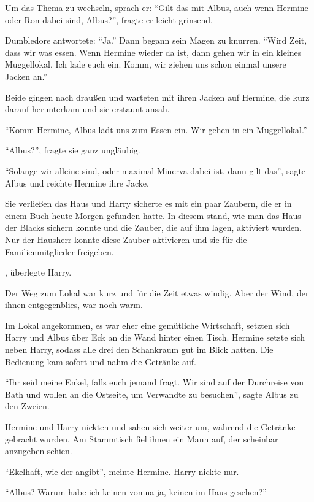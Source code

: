 Um das Thema zu wechseln, sprach er: \enquote{Gilt das mit Albus, auch wenn Hermine oder Ron dabei sind, Albus?}, fragte er leicht grinsend.

Dumbledore antwortete: \enquote{Ja.} Dann begann sein Magen zu knurren. \enquote{Wird Zeit, dass wir was essen. Wenn Hermine wieder da ist, dann gehen wir in ein kleines Muggellokal. Ich lade euch ein. Komm, wir ziehen uns schon einmal unsere Jacken an.}

Beide gingen nach draußen und warteten mit ihren Jacken auf Hermine, die kurz darauf herunterkam und sie erstaunt ansah.

\enquote{Komm Hermine, Albus lädt uns zum Essen ein. Wir gehen in ein Muggellokal.}

\enquote{Albus?}, fragte sie ganz ungläubig.

\enquote{Solange wir alleine sind, oder maximal Minerva dabei ist, dann gilt das}, sagte Albus und reichte Hermine ihre Jacke.

Sie verließen das Haus und Harry sicherte es mit ein paar Zaubern, die er in einem Buch heute Morgen gefunden hatte. In diesem stand, wie man das Haus der Blacks sichern konnte und die Zauber, die auf ihm lagen, aktiviert wurden. Nur der Hausherr konnte diese Zauber aktivieren und sie für die Familienmitglieder freigeben.

, überlegte Harry.

Der Weg zum Lokal war kurz und für die Zeit etwas windig. Aber der Wind, der ihnen entgegenblies, war noch warm.

Im Lokal angekommen, es war eher eine gemütliche Wirtschaft, setzten sich Harry und Albus über Eck an die Wand hinter einen Tisch. Hermine setzte sich neben Harry, sodass alle drei den Schankraum gut im Blick hatten. Die Bedienung kam sofort und nahm die Getränke auf.

\enquote{Ihr seid meine Enkel, falls euch jemand fragt. Wir sind auf der Durchreise von Bath und wollen an die Ostseite, um Verwandte zu besuchen}, sagte Albus zu den Zweien.

Hermine und Harry nickten und sahen sich weiter um, während die Getränke gebracht wurden. Am Stammtisch fiel ihnen ein Mann auf, der scheinbar anzugeben schien.

\enquote{Ekelhaft, wie der angibt}, meinte Hermine. Harry nickte nur.

\enquote{Albus? Warum habe ich keinen vom\abs na ja, keinen im Haus gesehen?}

